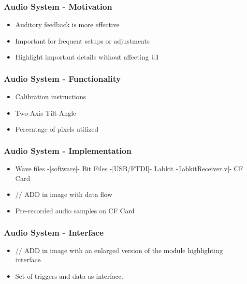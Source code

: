 \documentclass{beamer}
\begin{document}
\begin{frame}
\frametitle{Audio System - Motivation}
\begin{itemize}
	\item Auditory feedback is more effective
	\item Important for frequent setups or adjustments
	\item Highlight important details without affecting UI
\end{itemize}
\end{frame}

\begin{frame}
\frametitle{Audio System - Functionality}
\begin{itemize}
	\item Calibration instructions
	\item Two-Axis Tilt Angle
	\item Percentage of pixels utilized
\end{itemize}
\end{frame}

\begin{frame}
\frametitle{Audio System - Implementation}
\begin{itemize}
	\texttt{[image: img/audioimpl]}
	\item Wave files -[software]- Bit Files -[USB/FTDI]- Labkit -[labkitReceiver.v]- CF Card
	\item // ADD in image with data flow
	\item Pre-recorded audio samples on CF Card
\end{itemize}
\end{frame}

\begin{frame}
\frametitle{Audio System - Interface}
\begin{itemize}
	\item // ADD in image with an enlarged version of the module highlighting interface
	\item Set of triggers and data as interface.
\end{itemize}
\end{frame}
\end{document}

